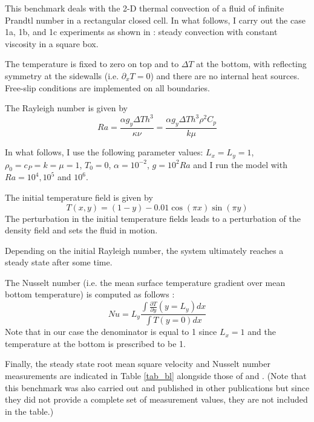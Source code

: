 
This benchmark deals with the 2-D thermal convection of a fluid 
of infinite Prandtl number in a rectangular closed cell.
In what follows, I carry out the case 1a, 1b, and 1c experiments as shown in \cite{blbc89}:
steady convection with constant viscosity in a square box.

The temperature is fixed to zero on top and to $\Delta T$ at the bottom, 
with reflecting symmetry at the sidewalls (i.e. $\partial_x T=0$) 
and there are no internal heat sources. 
Free-slip conditions are implemented on all boundaries. 

The Rayleigh number is given by
\begin{equation}
Ra = \frac{\alpha g_y \Delta T h^3 }{\kappa \nu}
=\frac{\alpha g_y \Delta T h^3 \rho^2 C_p}{k \mu}
\end{equation}

In what follows, I use the following parameter values:  %
$L_x=L_y=1$,$\rho_0=c_P=k=\mu=1$, $T_0=0$, $\alpha=10^{-2}$, $g=10^{2}Ra$
and I run the model with $Ra=10^4,10^{5}$ and $10^6$.

The initial temperature field is given by 
\begin{equation}
T(x,y)=(1-y) - 0.01\cos(\pi x) \sin(\pi y)
\end{equation}
The perturbation in the initial temperature fields leads to 
a perturbation of the density field and sets the fluid in motion. 

Depending on the initial Rayleigh number, the system ultimately reaches a 
steady state after some time. 

The Nusselt number (i.e. the mean surface temperature gradient over mean bottom temperature)
is computed as follows \cite{blbc89}:
\begin{equation}
Nu = L_y \frac{\int \frac{\partial T}{\partial y}(y=L_y) dx  }{\int T(y=0) dx}
\label{eqNu}
\end{equation}
Note that in our case the denominator is equal to 1 since $L_x=1$ and the temperature at the 
bottom is prescribed to be 1.

Finally, the steady state root mean square velocity and Nusselt number measurements
are indicated in Table \ref{tab_bl} alongside those of \cite{blbc89} and \cite{tack94}.
(Note that this benchmark was also carried out and published in  
other publications \cite{trha98,albe00,gery10,dawk11,lezh11} but since they did not provide  a complete set
of measurement values, they are not included in the table.)

